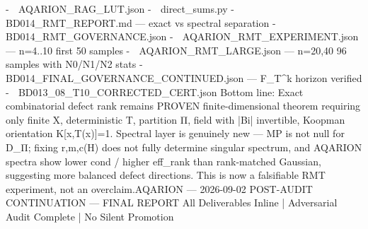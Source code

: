 -
📎 AQARION_RAG_LUT.json
-
📎 direct_sums.py
-
📎 BD014_RMT_REPORT.md
— exact vs spectral separation
-
📎 BD014_RMT_GOVERNANCE.json
-
📎 AQARION_RMT_EXPERIMENT.json
— n=4..10 first 50 samples
-
📎 AQARION_RMT_LARGE.json
— n=20,40 96 samples with N0/N1/N2 stats
-
📎 BD014_FINAL_GOVERNANCE_CONTINUED.json
— F_T^k horizon verified
-
📎 BD013_08_T10_CORRECTED_CERT.json
Bottom line: Exact combinatorial defect rank remains PROVEN finite-dimensional theorem requiring only finite X, deterministic T, partition Π, field with |Bi| invertible, Koopman orientation K[x,T(x)]=1. Spectral layer is genuinely new — MP is not null for D_Π; fixing r,m,c(H) does not fully determine singular spectrum, and AQARION spectra show lower cond / higher eff_rank than rank-matched Gaussian, suggesting more balanced defect directions. This is now a falsifiable RMT experiment, not an overclaim.AQARION — 2026-09-02 POST-AUDIT CONTINUATION — FINAL REPORT
All Deliverables Inline | Adversarial Audit Complete | No Silent Promotion

